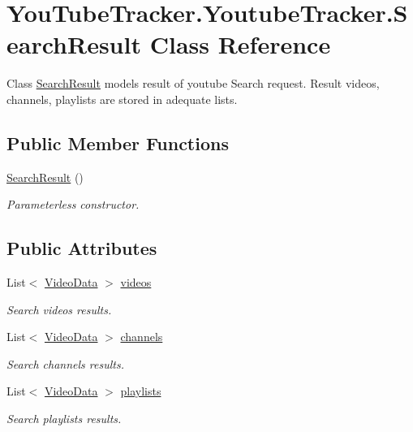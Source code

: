 \hypertarget{class_you_tube_tracker_1_1_youtube_tracker_1_1_search_result}{}\section{You\+Tube\+Tracker.\+Youtube\+Tracker.\+Search\+Result Class Reference}
\label{class_you_tube_tracker_1_1_youtube_tracker_1_1_search_result}


Class {\ttfamily \mbox{\hyperlink{class_you_tube_tracker_1_1_youtube_tracker_1_1_search_result}{Search\+Result}}} models result of youtube Search request. Result videos, channels, playlists are stored in adequate lists.  


\subsection*{Public Member Functions}
\begin{DoxyCompactItemize}
\item 
\mbox{\hyperlink{class_you_tube_tracker_1_1_youtube_tracker_1_1_search_result_a14c8dd3872fb03f75075f6b311f64694}{Search\+Result}} ()
\begin{DoxyCompactList}\small\item\em Parameterless constructor. \end{DoxyCompactList}\end{DoxyCompactItemize}
\subsection*{Public Attributes}
\begin{DoxyCompactItemize}
\item 
List$<$ \mbox{\hyperlink{struct_you_tube_tracker_1_1_video_data}{Video\+Data}} $>$ \mbox{\hyperlink{class_you_tube_tracker_1_1_youtube_tracker_1_1_search_result_a59c445d69a5f87735ddb589d7e3be7f8}{videos}}
\begin{DoxyCompactList}\small\item\em Search videos results. \end{DoxyCompactList}\item 
List$<$ \mbox{\hyperlink{struct_you_tube_tracker_1_1_video_data}{Video\+Data}} $>$ \mbox{\hyperlink{class_you_tube_tracker_1_1_youtube_tracker_1_1_search_result_a1edc3536b63100ee775fa1c7ab5f6569}{channels}}
\begin{DoxyCompactList}\small\item\em Search channels results. \end{DoxyCompactList}\item 
List$<$ \mbox{\hyperlink{struct_you_tube_tracker_1_1_video_data}{Video\+Data}} $>$ \mbox{\hyperlink{class_you_tube_tracker_1_1_youtube_tracker_1_1_search_result_a4d9162b386c247731a23d8c44934fdbf}{playlists}}
\begin{DoxyCompactList}\small\item\em Search playlists results. \end{DoxyCompactList}\end{DoxyCompactItemize}


